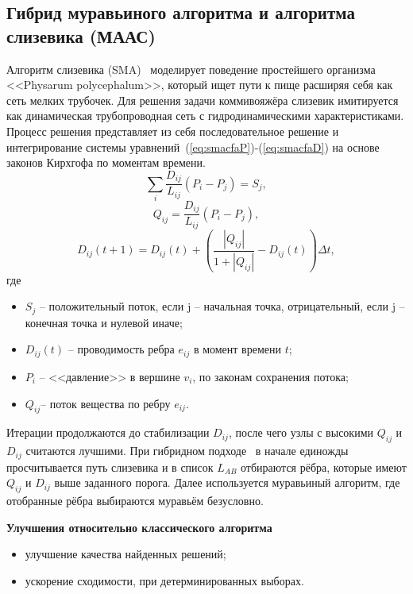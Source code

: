 \subsection*{Гибрид муравьиного алгоритма и алгоритма слизевика (МААС)}

Алгоритм слизевика (SMA)~\cite{smacfa} моделирует поведение простейшего организма <<Physarum polycephalum>>, который ищет пути к пище расширяя себя как сеть мелких трубочек. Для решения задачи коммивояжёра слизевик имитируется как динамическая трубопроводная сеть с гидродинамическими характеристиками. Процесс решения представляет из себя последовательное решение и интегрирование системы уравнений~(\ref{eq:smacfaP})-(\ref{eq:smacfaD}) на основе законов Кирхгофа по моментам времени.
\begin{equation}
	\sum_i \frac{D_{ij}}{L_{ij}} (P_i - P_j) = S_j,
	\label{eq:smacfaP}
\end{equation}
\begin{equation}
	Q_{ij} = \frac{D_{ij}}{L_{ij}} (P_i - P_j),
	\label{eq:smacfaQ}
\end{equation}
\begin{equation}
	D_{ij}(t+1) = D_{ij}(t) + \left(\frac{|Q_{ij}|}{1 + |Q_{ij}|} - D_{ij}(t)\right)\Delta t,
	\label{eq:smacfaD}
\end{equation}
\begingroup
\samepage
где
\begin{itemize}
	\item $S_j$ -- положительный поток, если j -- начальная точка, отрицательный, если j -- конечная точка и нулевой иначе;
	\item $D_{ij}(t)$ -- проводимость ребра $e_{ij}$ в момент времени $t$;
	\item $P_i$ -- <<давление>> в вершине $v_i$, по законам сохранения потока;
	\item $Q_{ij}$-- поток вещества по ребру $e_{ij}$.
\end{itemize}
\endgroup
Итерации продолжаются до стабилизации $D_{ij}$, после чего узлы с высокими $Q_{ij}$ и $D_{ij}$ считаются лучшими. При гибридном подходе~\cite{smacfa} в начале единожды просчитывается путь слизевика и в список $L_{AB}$ отбираются рёбра, которые имеют $Q_{ij}$ и $D_{ij}$ выше заданного порога. Далее используется муравьиный алгоритм, где отобранные рёбра выбираются муравьём безусловно.

\textbf{Улучшения относительно классического алгоритма}

\begin{itemize}
	\item улучшение качества найденных решений;
	\item ускорение сходимости, при детерминированных выборах.
\end{itemize}

